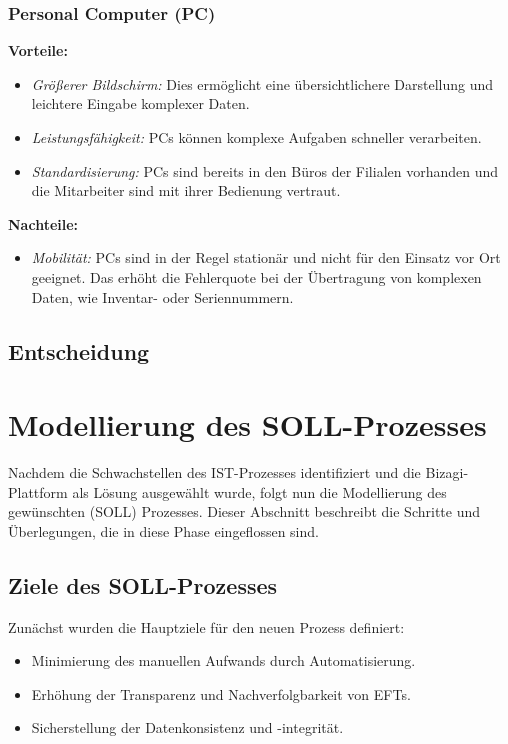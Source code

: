 \documentclass[12pt, a4paper]{article}
\begin{document}
\subsubsection{Personal Computer (PC)}

\textbf{Vorteile:}
\begin{itemize}
\item \textit{Größerer Bildschirm:} Dies ermöglicht eine übersichtlichere Darstellung und leichtere Eingabe komplexer Daten.
\item \textit{Leistungsfähigkeit:} PCs können komplexe Aufgaben schneller verarbeiten.
\item \textit{Standardisierung:} PCs sind bereits in den Büros der Filialen vorhanden und die Mitarbeiter sind mit ihrer Bedienung vertraut.
\end{itemize}

\textbf{Nachteile:}
\begin{itemize}
\item \textit{Mobilität:} PCs sind in der Regel stationär und nicht für den Einsatz vor Ort geeignet. Das erhöht die Fehlerquote bei der Übertragung von komplexen Daten,
wie Inventar- oder Seriennummern.
\end{itemize}

\subsection{Entscheidung}


\section{Modellierung des SOLL-Prozesses}

Nachdem die Schwachstellen des IST-Prozesses identifiziert und die Bizagi-Plattform als Lösung ausgewählt wurde, folgt nun die Modellierung des gewünschten (SOLL) Prozesses. 
Dieser Abschnitt beschreibt die Schritte und Überlegungen, die in diese Phase eingeflossen sind.

\subsection{Ziele des SOLL-Prozesses}

Zunächst wurden die Hauptziele für den neuen Prozess definiert:
\begin{itemize}
\item Minimierung des manuellen Aufwands durch Automatisierung.
\item Erhöhung der Transparenz und Nachverfolgbarkeit von EFTs.
\item Sicherstellung der Datenkonsistenz und -integrität.
\end{itemize}
\end{document}

